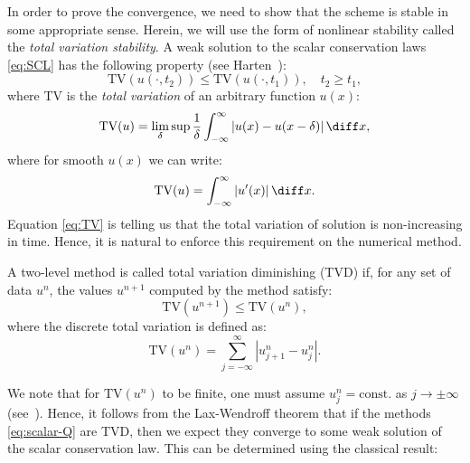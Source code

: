 In order to prove the convergence, we need to show that the scheme is stable in some appropriate sense. Herein, we will use the form of nonlinear stability called the \textit{total variation stability}. A weak solution to the scalar conservation laws \eqref{eq:SCL} has the following property (see Harten~\cite{har83b}):
\begin{equation} \label{eq:TV}
\text{TV} \left( u \left( \cdot , t_2 \right) \right) \leq \text{TV} \left( u \left( \cdot , t_1 \right) \right), \quad t_2 \geq t_1,
\end{equation}
where TV is the \textit{total variation} of an arbitrary function $ u(x) $:
\begin{equation}
\text{TV}(u) = \underset{\delta}{\lim} \sup \frac{1}{\delta} \int_{-\infty}^{\infty} \left| u(x) - u(x-\delta) \right | \diff x, 																																			
\end{equation}
where for smooth $ u(x) $ we can write:
\begin{equation}
\text{TV}(u) = \int_{-\infty}^{\infty} \left| u'(x) \right| \diff x.
\end{equation}
Equation \eqref{eq:TV} is telling us that the total variation of solution is non-increasing in time. Hence, it is natural to enforce this requirement on the numerical method. 
\begin{definition} \label{def:TVD}
A two-level method is called total variation diminishing (TVD) if, for any set of data $ u^n $, the values $ u^{n+1} $ computed by the method satisfy:
\begin{equation}
\text{TV} ( u^{n+1} ) \leq \text{TV}\left( u^n \right),
\end{equation}
where the discrete total variation is defined as:
\begin{equation}
\text{TV} \left( u^n \right) = \sum_{j=-\infty}^{\infty} | u_{j+1}^n - u_j^n |.
\end{equation}
\end{definition}
We note that for $ \text{TV}(u^n) $ to be finite, one must assume $ u_j^n = \text{const.} $ as $ j \rightarrow \pm \infty $ (see~\cite{lev01,tor09}). Hence, it follows from the Lax-Wendroff theorem that if the methods \eqref{eq:scalar-Q} are TVD, then we expect they converge to some weak solution of the scalar conservation law. This can be determined using the classical result:
